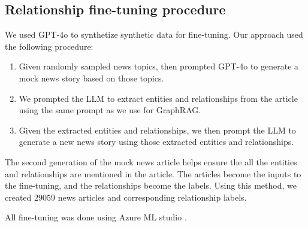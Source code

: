\subsection{Relationship fine-tuning procedure}

We used GPT-4o to synthetize synthetic data for fine-tuning.
Our approach used the following procedure:
\begin{enumerate}
    \item Given randomly sampled news topics, then prompted GPT-4o to generate a mock news story based on those topics.
    \item We prompted the LLM to extract entities and relationships from the article using the same prompt as we use for GraphRAG.
    \item Given the extracted entities and relationships, we then prompt the LLM to generate a new news story using those extracted entities and relationships. 
\end{enumerate}
The second generation of the mock news article helps ensure the all the entities and relationships are mentioned in the article.
The articles become the inputs to the fine-tuning, and the relationships become the labels.
Using this method, we created 29059 news articles and corresponding relationship labels.

All fine-tuning was done using Azure ML studio \cite{azure_ml_studio}.